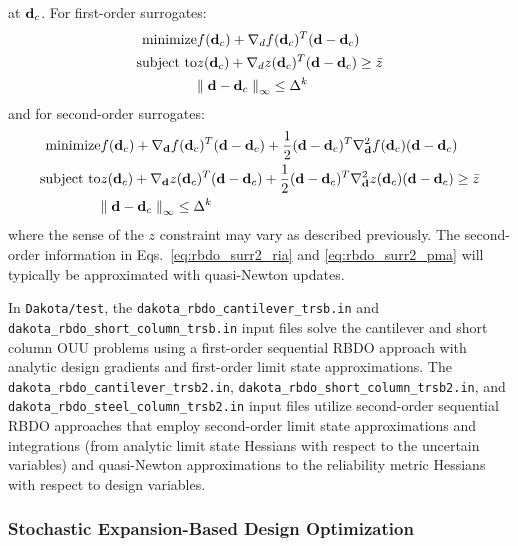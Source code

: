 at ${\bf d}_c$.  For first-order surrogates:
\begin{eqnarray}
  {\rm minimize }     & f({\bf d}_c) + \nabla_d f({\bf d}_c)^T
({\bf d} - {\bf d}_c) \nonumber \\
  {\rm subject \ to } & z({\bf d}_c) + \nabla_d z({\bf d}_c)^T ({\bf d} - {\bf d}_c) 
\ge \bar{z} \nonumber \\
& {\parallel {\bf d} - {\bf d}_c \parallel}_\infty \le \Delta^k
\label{eq:rbdo_surr1_pma}
\end{eqnarray}
and for second-order surrogates:
\begin{eqnarray}
  {\rm minimize }     & f({\bf d}_c) + \nabla_{\bf d} f({\bf d}_c)^T
({\bf d} - {\bf d}_c) + \frac{1}{2} ({\bf d} - {\bf d}_c)^T 
\nabla^2_{\bf d} f({\bf d}_c) ({\bf d} - {\bf d}_c) \nonumber \\
  {\rm subject \ to } & z({\bf d}_c) + \nabla_{\bf d} z({\bf d}_c)^T ({\bf d} - {\bf d}_c)
 + \frac{1}{2} ({\bf d} - {\bf d}_c)^T \nabla^2_{\bf d} z({\bf d}_c) 
({\bf d} - {\bf d}_c) \ge \bar{z} \nonumber \\
& {\parallel {\bf d} - {\bf d}_c \parallel}_\infty \le \Delta^k
\label{eq:rbdo_surr2_pma}
\end{eqnarray}
where the sense of the $z$ constraint may vary as described
previously.  The second-order information in
Eqs.~\ref{eq:rbdo_surr2_ria} and \ref{eq:rbdo_surr2_pma} will
typically be approximated with quasi-Newton updates.

In \texttt{Dakota/test}, the
\texttt{dakota\_rbdo\_cantilever\_trsb.in} and\\
\texttt{dakota\_rbdo\_short\_column\_trsb.in} input files solve 
the cantilever and short column OUU problems using a first-order
sequential RBDO approach with analytic design gradients and
first-order limit state approximations.  The
\texttt{dakota\_rbdo\_cantilever\_trsb2.in},
\texttt{dakota\_rbdo\_short\_column\_trsb2.in}, and 
\texttt{dakota\_rbdo\_steel\_column\_trsb2.in} input files 
utilize second-order sequential RBDO approaches that employ
second-order limit state approximations and integrations (from
analytic limit state Hessians with respect to the uncertain variables)
and quasi-Newton approximations to the reliability metric Hessians
with respect to design variables.

\subsubsection{Stochastic Expansion-Based Design Optimization} \label{models:ex:ouu:sebdo}

